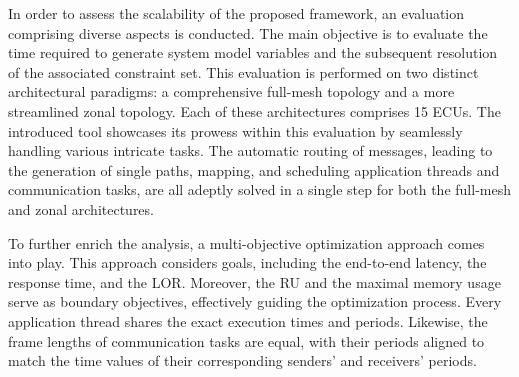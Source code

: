 
      In order to assess the scalability of the proposed framework, an evaluation comprising diverse aspects is conducted. The main objective is to evaluate the time required to generate system model variables and the subsequent resolution of the associated constraint set. This evaluation is performed on two distinct architectural paradigms: a comprehensive full-mesh topology and a more streamlined zonal topology. Each of these architectures comprises 15 ECUs. 
      The introduced tool showcases its prowess within this evaluation by seamlessly handling various intricate tasks. The automatic routing of messages, leading to the generation of single paths, mapping, and scheduling application threads and communication tasks, are all adeptly solved in a single step for both the full-mesh and zonal architectures.
      
      To further enrich the analysis, a multi-objective optimization approach comes into play. This approach considers goals, including the end-to-end latency, the response time, and the LOR. Moreover, the RU and the maximal memory usage serve as boundary objectives, effectively guiding the optimization process. Every application thread shares the exact execution times and periods. Likewise, the frame lengths of communication tasks are equal, with their periods aligned to match the time values of their corresponding senders' and receivers' periods.








